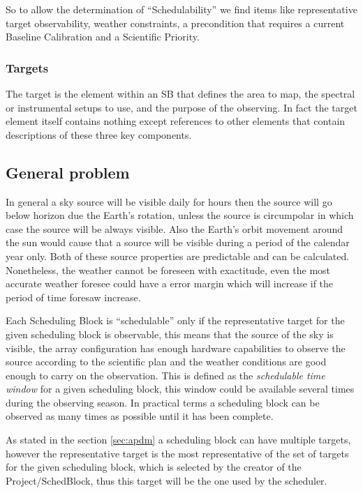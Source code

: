 \documentclass[11pt]{article}
\begin{document}
So to allow the determination of ``Schedulability'' we find items like representative target observability, weather constraints, a precondition that requires a current Baseline Calibration and a Scientific Priority.

\subsubsection*{Targets}
The target is the element within an SB that defines the area to map, the spectral or instrumental setups to use, and the purpose of the observing. In fact the target element itself contains nothing except references to other elements that contain descriptions of these three key components.

\subsection{General problem}
In general a sky source will be visible daily for hours then the source will go below horizon due the Earth's rotation, unless the source is circumpolar in which case the source will be always visible. Also the Earth's orbit movement around the sun would cause that a source will be visible during a period of the calendar year only. Both of these source properties are predictable and can be calculated. Nonetheless, the weather cannot be foreseen with exactitude, even the most accurate weather foresee could have a error margin which will increase if the period of time foresaw increase.

Each Scheduling Block is ``schedulable'' only if the representative target for the given scheduling block is observable, this means that the source of the sky is visible, the array configuration has enough hardware capabilities to observe the source according to the scientific plan and the weather conditions are good enough to carry on the observation. This is defined as the \textit{schedulable time window} for a given scheduling block, this window could be available several times during the observing season. In practical terms a scheduling block can be observed as many times as possible until it has been complete.

As stated in the section \ref{sec:apdm} a scheduling block can have multiple targets, however the representative target is the most representative of the set of targets for the given scheduling block, which is selected by the creator of the Project/SchedBlock, thus this target will be the one used by the scheduler.
\end{document}
